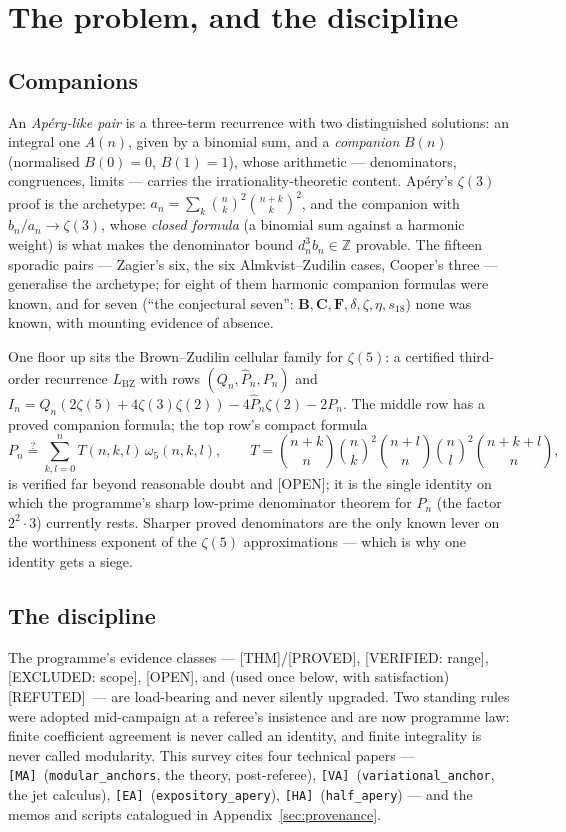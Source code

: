 \documentclass[11pt,reqno]{amsart}
\theoremstyle{plain}
\theoremstyle{definition}
\theoremstyle{remark}
\newcommand{\Z}{\mathbb{Z}}
\newcommand{\bin}[2]{\binom{#1}{#2}}
\newcommand{\Lbz}{L_{\mathrm{BZ}}}
\newcommand{\Thm}{\textup{\textsf{[THM]}}}
\newcommand{\Proved}{\textup{\textsf{[PROVED]}}}
\newcommand{\VerifiedR}[1]{\textup{\textsf{[VERIFIED: #1]}}}
\newcommand{\ExcludedR}[1]{\textup{\textsf{[EXCLUDED: #1]}}}
\newcommand{\Open}{\textup{\textsf{[OPEN]}}}
\newcommand{\Refuted}{\textup{\textsf{[REFUTED]}}}
\newcommand{\MA}{\texttt{[MA]}}
\newcommand{\VA}{\texttt{[VA]}}
\newcommand{\EA}{\texttt{[EA]}}
\newcommand{\HA}{\texttt{[HA]}}
\begin{document}
\section{The problem, and the discipline}\label{sec:problem}

\subsection{Companions}
An \emph{Ap\'ery-like pair} is a three-term recurrence with two
distinguished solutions: an integral one $A(n)$, given by a binomial sum,
and a \emph{companion} $B(n)$ (normalised $B(0)=0$, $B(1)=1$), whose
arithmetic --- denominators, congruences, limits --- carries the
irrationality-theoretic content. Ap\'ery's $\zeta(3)$ proof is the
archetype: $a_n=\sum_k\bin nk^2\bin{n+k}k^2$, and the companion with
$b_n/a_n\to\zeta(3)$, whose \emph{closed formula} (a binomial sum against
a harmonic weight) is what makes the denominator bound $d_n^3b_n\in\Z$
provable. The fifteen sporadic pairs --- Zagier's six, the six
Almkvist--Zudilin cases, Cooper's three --- generalise the archetype; for
eight of them harmonic companion formulas were known, and for seven
(``the conjectural seven'': $\mathbf B,\mathbf C,\mathbf F,\delta,\zeta,
\eta,s_{18}$) none was known, with mounting evidence of absence.

One floor up sits the Brown--Zudilin cellular family for $\zeta(5)$: a
certified third-order recurrence $\Lbz$ with rows $(Q_n,\hat P_n,P_n)$
and
$I_n=Q_n(2\zeta(5)+4\zeta(3)\zeta(2))-4\hat P_n\zeta(2)-2P_n$. The middle
row has a proved companion formula; the top row's compact formula
\begin{equation}\label{eq:bridge}
P_n\overset{?}{=}\sum_{k,l=0}^nT(n,k,l)\,\omega_5(n,k,l),
\qquad
T=\bin{n+k}{n}\bin nk^2\bin{n+l}{n}\bin nl^2\bin{n+k+l}{n},
\tag{BRIDGE}
\end{equation}
is verified far beyond reasonable doubt and \Open; it is the single
identity on which the programme's sharp low-prime denominator theorem for
$P_n$ (the factor $2^2\cdot3$) currently rests. Sharper proved
denominators are the only known lever on the worthiness exponent of the
$\zeta(5)$ approximations --- which is why one identity gets a siege.

\subsection{The discipline}
The programme's evidence classes --- \Thm/\Proved, \VerifiedR{range},
\ExcludedR{scope}, \Open, and (used once below, with satisfaction)
\Refuted\ --- are load-bearing and never silently upgraded. Two standing
rules were adopted mid-campaign at a referee's insistence and are now
programme law: finite coefficient agreement is never called an identity,
and finite integrality is never called modularity. This survey cites four
technical papers --- \MA\ (\texttt{modular\_anchors}, the theory,
post-referee), \VA\ (\texttt{variational\_anchor}, the jet calculus),
\EA\ (\texttt{expository\_apery}), \HA\ (\texttt{half\_apery}) --- and
the memos and scripts catalogued in Appendix~\ref{sec:provenance}.
\end{document}
